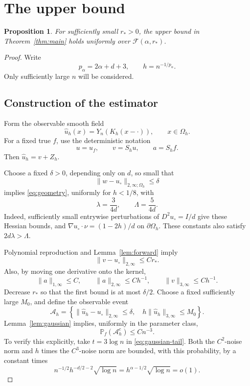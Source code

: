 \documentclass[11pt]{article}
\newtheorem{proposition}[theorem]{Proposition}
\theoremstyle{remark}
\newcommand{\Prob}{\mathbb P}
\newcommand{\cF}{\mathcal F}
\begin{document}
\section{The upper bound}

\begin{proposition}\label{prop:upper}
For sufficiently small \(r_*>0\), the upper bound in
Theorem~\ref{thm:main} holds uniformly over
\(\cF(\alpha,r_*)\).
\end{proposition}

\begin{proof}
Write
\[
p_\alpha=2\alpha+d+3,\qquad h=n^{-1/p_\alpha}.
\]
Only sufficiently large \(n\) will be considered.

\subsection*{Construction of the estimator}

Form the observable smooth field
\[
\widehat u_h(x)=Y_n(K_h(x-\cdot)),\qquad x\in\Omega_h.
\]
For a fixed true \(f\), use the deterministic notation
\[
u=u_f,\qquad v=S_hu,\qquad a=S_hf.
\]
Then \(\widehat u_h=v+Z_h\).

Choose a fixed \(\delta>0\), depending only on \(d\), so small that
\[
\|w-u_\circ\|_{2,\infty;\Omega_h}\leq\delta
\]
implies \eqref{eq:geometry}, uniformly for \(h<1/8\), with
\[
\lambda=\frac{3}{4d},\qquad
\Lambda=\frac{5}{4d}.
\]
Indeed, sufficiently small entrywise perturbations of \(D^2u_\circ=I/d\)
give these Hessian bounds, and
\(\nabla u_\circ\cdot\nu=(1-2h)/d\) on \(\partial\Omega_h\).
These constants also satisfy \(2d\lambda>\Lambda\).

Polynomial reproduction and Lemma~\ref{lem:forward} imply
\[
\|v-u_\circ\|_{2,\infty}\leq Cr_*.
\]
Also, by moving one derivative onto the kernel,
\[
\|a\|_{1,\infty}\leq C,\qquad
\|a\|_{2,\infty}\leq Ch^{-1},\qquad
\|v\|_{3,\infty}\leq Ch^{-1}.
\]
Decrease \(r_*\) so that the first bound is at most \(\delta/2\).
Choose a fixed sufficiently large \(M_0\), and define the observable
event
\[
\mathcal A_h=
\left\{
\|\widehat u_h-u_\circ\|_{2,\infty}\leq\delta,\quad
h\|\widehat u_h\|_{3,\infty}\leq M_0
\right\}.
\]
Lemma~\ref{lem:gaussian} implies, uniformly in the parameter class,
\begin{equation}\label{eq:good-event}
\Prob_f(\mathcal A_h^c)\leq Cn^{-3}.
\end{equation}
To verify this explicitly, take \(t=3\log n\) in
\eqref{eq:gaussian-tail}. Both the \(C^2\)-noise norm and \(h\)
times the \(C^3\)-noise norm are bounded, with this probability,
by a constant times
\[
n^{-1/2}h^{-d/2-2}\sqrt{\log n}
=h^{\alpha-1/2}\sqrt{\log n}=o(1).
\]


\end{proof}
\end{document}
